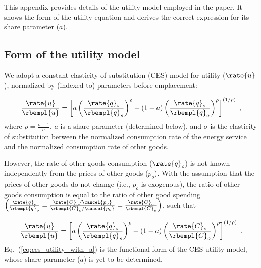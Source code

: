 
This appendix provides details of the utility model employed in the paper.
It shows the form of the utility equation and
derives the correct expression for its share parameter ($a$).


\subsection{Form of the utility model}
\label{sec:utility_model_form}

We adopt a constant elasticity of substitution (CES) model for utility ($\rate{u}$),
normalized by (indexed to) parameters before emplacement:

\begin{equation}
  \frac{\rate{u}}{\rbempl{u}} = 
  \left[ a \left( \frac{\rate{q}_s}{\rbempl{q}_s} \right)^\rho 
        + (1-a) \left( \frac{\rate{q}_o}{\rbempl{q}_o} \right)^\rho  \right]^{(1/\rho)} \; ,
\end{equation}
%
where $\rho = \frac{\sigma - 1}{\sigma}$,
$a$ is a share parameter (determined below), and 
$\sigma$ is the elasticity of substitution between
the normalized consumption rate of the energy service and 
the normalized consumption rate of other goods.

However, the rate of other goods consumption ($\rate{q}_o$)
is not known independently from the prices of other goods ($p_o$).
With the assumption that the prices of other goods do not change
(i.e., $p_o$ is exogenous), 
the ratio of other goods consumption is equal to the ratio of other good spending
$\left( \frac{\rate{q}_o}{\rbempl{q}_o} = \frac{\rate{C}_o/\cancel{p_o}}{\rbempl{C}_o/\cancel{p_o}} = \frac{\rate{C}_o}{\rbempl{C}_o} \right)$, such that

\begin{equation} \label{eq:ces_utility_with_a}
  \frac{\rate{u}}{\rbempl{u}} = 
  \left[ a \left( \frac{\rate{q}_s}{\rbempl{q}_s} \right)^\rho 
        + (1-a) \left( \frac{\rate{C}_o}{\rbempl{C}_o} \right)^\rho  \right]^{(1/\rho)} \; .
\end{equation}
%
Eq.~(\ref{eq:ces_utility_with_a}) is the functional form of the CES utility model,
whose share parameter ($a$) is yet to be determined.


